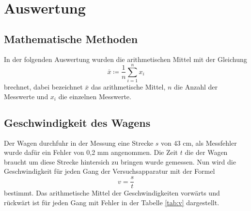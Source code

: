 \section{Auswertung}
\label{sec:Auswertung}
\subsection{Mathematische Methoden}
In der folgenden Auswertung wurden die arithmetischen Mittel mit der
Gleichung
\begin{equation}
  \bar{x} \coloneq \frac{1}{n} \sum_{i=1}^n x_i
  \label{eqn:aM}
\end{equation}
brechnet, dabei bezeichnet $\bar{x}$ das arithmetische Mittel, $n$ die Anzahl
der Messwerte und $x_i$ die einzelnen Messwerte.
\subsection{Geschwindigkeit des Wagens}
Der Wagen durchfuhr in der Messung eine Strecke $s$ von 43 cm, als Messfehler
wurde dafür ein Fehler von 0,2 mm angenommen. Die Zeit $t$ die der Wagen braucht
um diese Strecke hintersich zu bringen wurde gemessen. Nun wird die
Geschwindigkeit für jeden Gang der Versuchsapparatur  mit der Formel
\begin{equation*}
  v = \frac{s}{t}
\end{equation*}
bestimmt. Das arithmetische Mittel der Geschwindigkeiten vorwärts und rückwärt
ist für
jeden Gang mit Fehler in der Tabelle \ref{tab:v} dargestellt.
